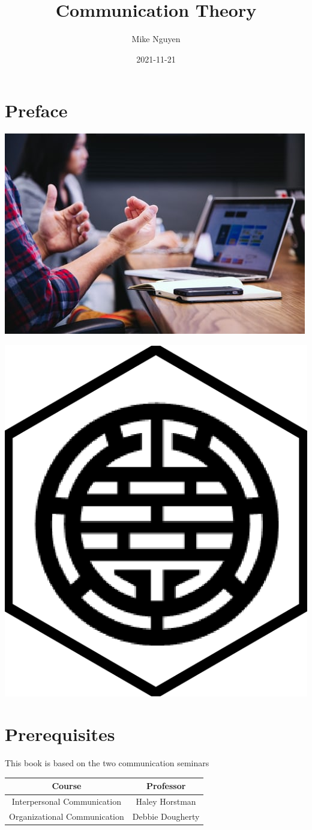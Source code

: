 \documentclass[
]{book}
\title{Communication Theory}
\author{Mike Nguyen}
\date{2021-11-21}
\begin{document}
\maketitle

{
\setcounter{tocdepth}{1}
\tableofcontents
}
\hypertarget{preface}{%
\chapter*{Preface}\label{preface}}

\includegraphics{cover.jpg}

\begin{center}\includegraphics[width=0.25\linewidth]{logo} \end{center}

\hypertarget{prerequisites}{%
\chapter{Prerequisites}\label{prerequisites}}

This book is based on the two communication seminars

\begin{longtable}[]{@{}cc@{}}
\toprule
Course & Professor\tabularnewline
\midrule
\endhead
Interpersonal Communication & Haley Horstman\tabularnewline
Organizational Communication & Debbie Dougherty\tabularnewline
\bottomrule
\end{longtable}
\end{document}

